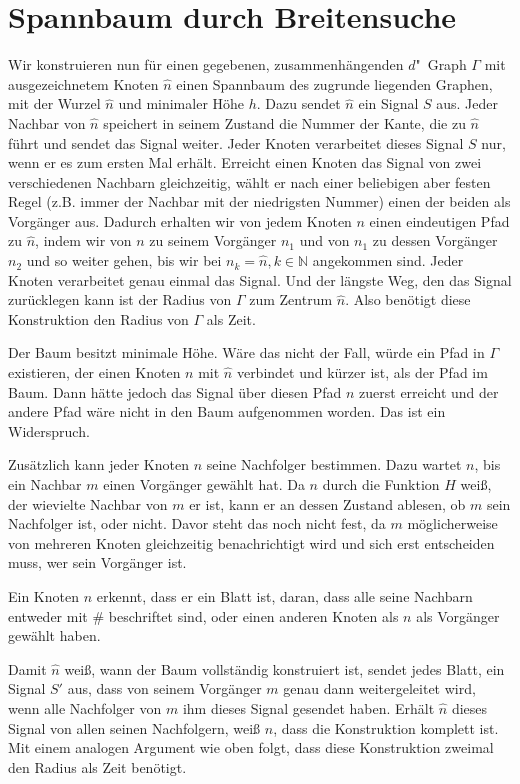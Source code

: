 \documentclass[11pt]{article}
\begin{document}
\section{Spannbaum durch Breitensuche}
Wir konstruieren nun für einen gegebenen, zusammenhängenden $d$"~Graph $\Gamma$ mit ausgezeichnetem Knoten $\hat{n}$ einen Spannbaum des zugrunde liegenden Graphen, mit der Wurzel $\hat{n}$ und minimaler Höhe $h$. 
Dazu sendet $\hat{n}$ ein Signal $S$ aus. Jeder Nachbar von $\hat{n}$ speichert in seinem Zustand die Nummer der Kante, die zu $\hat{n}$ führt und sendet das Signal weiter. 
Jeder Knoten verarbeitet dieses Signal $S$ nur, wenn er es zum ersten Mal erhält. 
Erreicht einen Knoten das Signal von zwei verschiedenen Nachbarn gleichzeitig, wählt er nach einer beliebigen aber festen Regel (z.B. immer der Nachbar mit der niedrigsten Nummer) einen der beiden als Vorgänger aus. 
Dadurch erhalten wir von jedem Knoten $n$ einen eindeutigen Pfad zu $\hat{n}$, indem wir von $n$ zu seinem Vorgänger $n_1$ und von $n_1$ zu dessen Vorgänger $n_2$ und so weiter gehen, bis wir bei $n_k=\hat{n}, k \in \mathbb{N}$ angekommen sind. 
Jeder Knoten verarbeitet genau einmal das Signal. 
Und der längste Weg, den das Signal zurücklegen kann ist der Radius von $\Gamma$ zum Zentrum $\hat{n}$. 
Also benötigt diese Konstruktion den Radius von $\Gamma$ als Zeit.

Der Baum besitzt minimale Höhe. 
Wäre das nicht der Fall, würde ein Pfad in $\Gamma$ existieren, der einen Knoten $n$ mit $\hat{n}$ verbindet und kürzer ist, als der Pfad im Baum. 
Dann hätte jedoch das Signal über diesen Pfad $n$ zuerst erreicht und der andere Pfad wäre nicht in den Baum aufgenommen worden. 
Das ist ein Widerspruch.

Zusätzlich kann jeder Knoten $n$ seine Nachfolger bestimmen. 
Dazu wartet $n$, bis ein Nachbar $m$ einen Vorgänger gewählt hat.
Da $n$ durch die Funktion $H$ weiß, der wievielte Nachbar von $m$ er ist, kann er an dessen Zustand ablesen, ob $m$ sein Nachfolger ist, oder nicht. 
Davor steht das noch nicht fest, da $m$ möglicherweise von mehreren Knoten gleichzeitig benachrichtigt wird und sich erst entscheiden muss, wer sein Vorgänger ist.

Ein Knoten $n$ erkennt, dass er ein Blatt ist, daran, dass alle seine Nachbarn entweder mit $\#$ beschriftet sind, oder einen anderen Knoten als $n$ als Vorgänger gewählt haben.

Damit $\hat{n}$ weiß, wann der Baum vollständig konstruiert ist, sendet jedes Blatt, ein Signal $S'$ aus, dass von seinem Vorgänger $m$ genau dann weitergeleitet wird, wenn alle Nachfolger von $m$ ihm dieses Signal gesendet haben. 
Erhält $\hat{n}$ dieses Signal von allen seinen Nachfolgern, weiß $\hat{n}$, dass die Konstruktion komplett ist.
Mit einem analogen Argument wie oben folgt, dass diese Konstruktion zweimal den Radius als Zeit benötigt.
\end{document}
